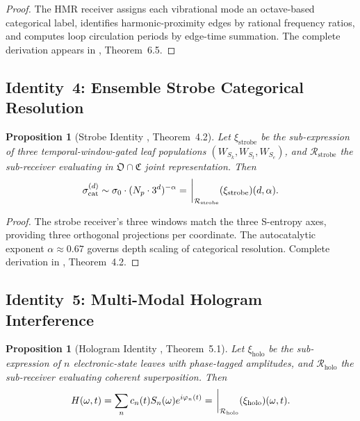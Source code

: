 \documentclass[11pt,twocolumn,a4paper]{article}
\newtheorem{proposition}[theorem]{Proposition}
\theoremstyle{definition}
\theoremstyle{remark}
\newcommand{\Recv}{\mathcal{R}}
\newcommand{\Osc}{\mathfrak{O}}
\newcommand{\Cat}{\mathfrak{C}}
\newcommand{\Sexp}{\xi}
\begin{document}
\begin{proof}
The HMR receiver assigns each vibrational mode an octave-based categorical label, identifies harmonic-proximity edges by rational frequency ratios, and computes loop circulation periods by edge-time summation. The complete derivation appears in \citep{sachikonye2025_hmr}, Theorem~6.5.
\end{proof}

\subsection{Identity~4: Ensemble Strobe Categorical Resolution}

\begin{proposition}[Strobe Identity \citep{sachikonye2025_strobes}, Theorem~4.2]
\label{prop:id_strobes}
Let $\Sexp_{\mathrm{strobe}}$ be the sub-expression of three temporal-window-gated leaf populations $(W_{S_k}, W_{S_t}, W_{S_e})$, and $\Recv_{\mathrm{strobe}}$ the sub-receiver evaluating in $\Osc \cap \Cat$ joint representation. Then
\begin{equation}
\sigma_{\mathrm{cat}}^{(d)} \sim \sigma_0 \cdot (N_p \cdot 3^d)^{-\alpha} = \eval_{\Recv_{\mathrm{strobe}}}(\Sexp_{\mathrm{strobe}})(d, \alpha).
\end{equation}
\end{proposition}

\begin{proof}
The strobe receiver's three windows match the three S-entropy axes, providing three orthogonal projections per coordinate. The autocatalytic exponent $\alpha \approx 0.67$ governs depth scaling of categorical resolution. Complete derivation in \citep{sachikonye2025_strobes}, Theorem~4.2.
\end{proof}

\subsection{Identity~5: Multi-Modal Hologram Interference}

\begin{proposition}[Hologram Identity \citep{sachikonye2025_holo}, Theorem~5.1]
\label{prop:id_holo}
Let $\Sexp_{\mathrm{holo}}$ be the sub-expression of $n$ electronic-state leaves with phase-tagged amplitudes, and $\Recv_{\mathrm{holo}}$ the sub-receiver evaluating coherent superposition. Then
\begin{equation}
H(\omega, t) = \sum_{n} c_n(t) S_n(\omega) e^{i \varphi_n(t)} = \eval_{\Recv_{\mathrm{holo}}}(\Sexp_{\mathrm{holo}})(\omega, t).
\end{equation}
\end{proposition}
\end{document}
